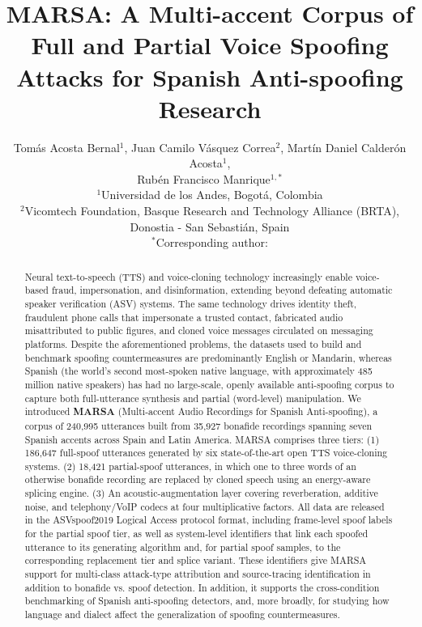 \documentclass[11pt]{article}
\title{\textbf{MARSA: A Multi-accent Corpus of Full and
Partial Voice Spoofing Attacks for Spanish Anti-spoofing Research}}
\author{%
Tom\'as Acosta Bernal$^{1}$, Juan Camilo V\'asquez Correa$^{2}$,
Mart\'in Daniel Calder\'on Acosta$^{1}$,\\
Rub\'en Francisco Manrique$^{1,\ast}$ \\[4pt]
\small $^{1}$Universidad de los Andes, Bogot\'a, Colombia \\
\small $^{2}$Vicomtech Foundation, Basque Research and Technology Alliance (BRTA), Donostia - San Sebastián, Spain \\
\small $^{\ast}$Corresponding author: \PENDING{email}
}
\date{}
\begin{document}
\maketitle

\begin{abstract}
\noindent
Neural text-to-speech (TTS) and voice-cloning technology increasingly
enable voice-based fraud, impersonation, and disinformation, extending beyond defeating automatic speaker verification (ASV) systems. The
same technology drives identity theft, fraudulent phone calls that
impersonate a trusted contact, fabricated audio misattributed to public
figures, and cloned voice messages circulated on messaging platforms. Despite the aforementioned problems, the datasets used to build and benchmark spoofing countermeasures
are predominantly English or Mandarin, whereas Spanish (the world's second
most-spoken native language, with approximately 485 million native
speakers) has had no large-scale, openly available anti-spoofing corpus to capture
both full-utterance synthesis and partial (word-level) manipulation. We introduced \textbf{MARSA} (Multi-accent Audio Recordings for Spanish
Anti-spoofing), a corpus of 240{,}995 utterances built
from 35{,}927 bonafide recordings spanning seven Spanish accents across
Spain and Latin America. MARSA comprises three tiers: (1) 186{,}647 full-spoof utterances generated by six state-of-the-art open TTS voice-cloning
systems. (2) 18{,}421 partial-spoof utterances, in
which one to three words of an otherwise bonafide recording are replaced
by cloned speech using an energy-aware splicing engine. (3) An
acoustic-augmentation layer covering reverberation, additive noise, and telephony/VoIP codecs at four multiplicative factors. All data are released in the ASVspoof2019 Logical Access protocol format, including frame-level spoof labels for the partial spoof tier, as well as system-level identifiers that link each spoofed utterance to its generating algorithm and, for partial spoof samples, to the corresponding replacement tier and splice variant. These identifiers give MARSA
support for multi-class attack-type attribution and source-tracing
identification in addition to bonafide vs. spoof detection. In addition, it supports the cross-condition benchmarking of Spanish anti-spoofing detectors, and, more broadly, for studying how language and dialect affect the generalization of spoofing countermeasures.
\end{abstract}
\end{document}

